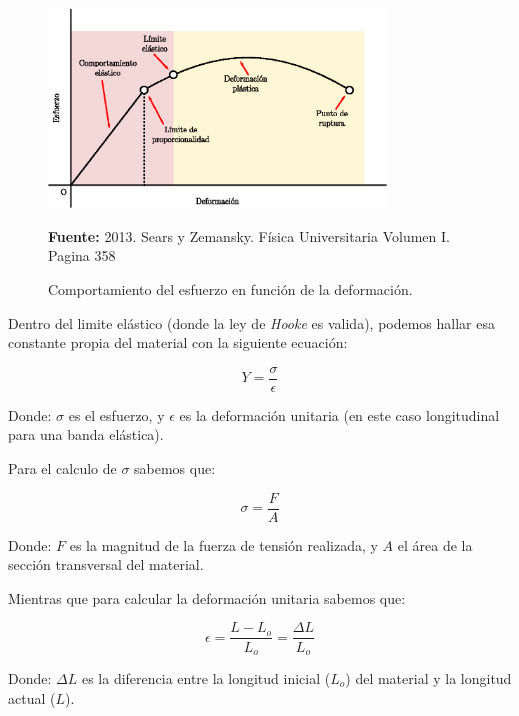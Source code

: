 \documentclass[letter,11pt]{article}
\newcommand{\source}[1]{\vspace{-11pt} \caption*{\small{\textbf{Fuente:} {#1}}}}
\begin{document}
\begin{figure}
\centering
\includegraphics[width=0.80\textwidth]{resources/f1.eps}
\caption{Comportamiento del esfuerzo en función de la deformación.}
\label{figura1}
\source{2013. Sears y Zemansky. Física Universitaria Volumen I. Pagina 358}
\end{figure}

Dentro del limite elástico (donde la ley de \emph{Hooke} es valida), podemos
hallar esa constante propia del material con la siguiente ecuación:

\begin{equation}
    Y = \frac{\sigma}{\epsilon}
\label{young1}
\end{equation}
\vspace{0.25cm}

Donde: $\sigma$ es el esfuerzo, y $\epsilon$ es la deformación unitaria (en este
caso longitudinal para una banda elástica).

Para el calculo de $\sigma$ sabemos que:

\begin{equation}
    \sigma = \frac{F}{A}
\label{sigma}
\end{equation}
\vspace{0.25cm}

Donde: $F$ es la magnitud de la fuerza de tensión realizada, y $A$ el área de la
sección transversal del material.

Mientras que para calcular la deformación unitaria sabemos que:

\begin{equation}
    \epsilon = \frac{L - L_o}{L_o} = \frac{\Delta L}{L_o}
\label{epsilon}
\end{equation}
\vspace{0.25cm}

Donde: $\Delta L$ es la diferencia entre la longitud inicial ($L_o$) del
material y la longitud actual ($L$).
\end{document}
